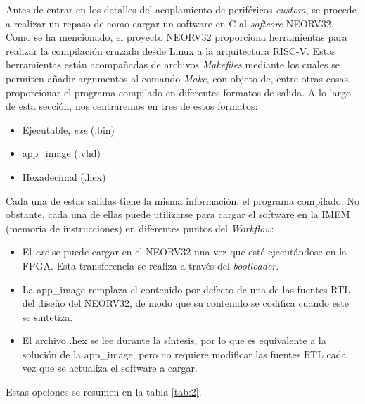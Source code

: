 Antes de entrar en los detalles del acoplamiento de periféricos \textit{custom}, se procede a realizar un repaso de como cargar un software en C al \textit{softcore} NEORV32.
Como se ha mencionado, el proyecto NEORV32 proporciona herramientas para realizar la compilación cruzada desde Linux a la arquitectura RISC-V.
Estas herramientas están acompañadas de archivos \textit{Makefiles} mediante los cuales se permiten añadir argumentos al comando \textit{Make}, con objeto de, entre otras cosas, proporcionar el programa compilado en diferentes formatos de salida.
A lo largo de esta sección, nos centraremos en tres de estos formatos:

\begin{itemize}
    \item Ejecutable, \textit{exe} (.bin)
    \item app\_image (.vhd)
    \item Hexadecimal (.hex)
\end{itemize} 

Cada una de estas salidas tiene la misma información, el programa compilado.
No obstante, cada una de ellas puede utilizarse para cargar el software en la IMEM (memoria de instrucciones) en diferentes puntos del \textit{Workflow}:

\begin{itemize}
    \item El \textit{exe} se puede cargar en el NEORV32 una vez que esté ejecutándose en la FPGA. Esta transferencia se realiza a través del \textit{bootloader}.
    \item La app\_image remplaza el contenido por defecto de una de las fuentes RTL del diseño del NEORV32, de modo que su contenido se codifica cuando este se sintetiza.
    \item El archivo .hex se lee durante la síntesis, por lo que es equivalente a la solución de la app\_image, pero no requiere modificar las fuentes RTL cada vez que se actualiza el software a cargar.
\end{itemize} 

Estas opciones se resumen en la tabla \ref{tab:2}.

